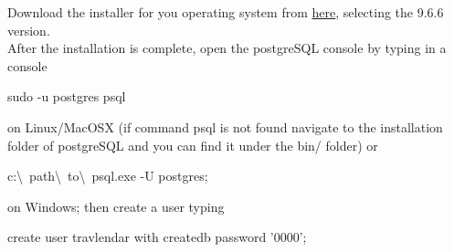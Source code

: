 Download the installer for you operating system from \href{https://www.enterprisedb.com/downloads/postgres-postgresql-downloads#linux}{here}, selecting the 9.6.6 version. \\
After the installation is complete, open the postgreSQL console by typing in a console 
\begin{commandshell}sudo -u postgres psql\end{commandshell} 
on Linux/MacOSX (if command psql is not found navigate to the installation folder of postgreSQL and you can find it under the bin/ folder) or 
\begin{commandshell}c:\textbackslash~path\textbackslash~to\textbackslash~psql.exe -U postgres;\end{commandshell} 
on Windows; then create a user typing \begin{commandshell}create user travlendar with createdb password '0000';\end{commandshell}